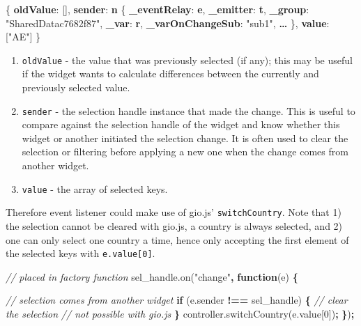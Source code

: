 \documentclass[10pt,]{krantz}
\makeatletter
\newenvironment{Shaded}{\begin{snugshade}}{\end{snugshade}}
\newcommand{\AttributeTok}[1]{\textcolor[rgb]{0.61,0.61,0.61}{#1}}
\newcommand{\CommentTok}[1]{\textcolor[rgb]{0.37,0.37,0.37}{\textit{#1}}}
\newcommand{\ControlFlowTok}[1]{\textcolor[rgb]{0.27,0.27,0.27}{\textbf{#1}}}
\newcommand{\DecValTok}[1]{\textcolor[rgb]{0.06,0.06,0.06}{#1}}
\newcommand{\ErrorTok}[1]{\textcolor[rgb]{0.14,0.14,0.14}{\textbf{#1}}}
\newcommand{\FunctionTok}[1]{\textcolor[rgb]{0,0,0}{#1}}
\newcommand{\KeywordTok}[1]{\textcolor[rgb]{0.27,0.27,0.27}{\textbf{#1}}}
\newcommand{\NormalTok}[1]{#1}
\newcommand{\OperatorTok}[1]{\textcolor[rgb]{0.43,0.43,0.43}{\textbf{#1}}}
\newcommand{\OtherTok}[1]{\textcolor[rgb]{0.37,0.37,0.37}{#1}}
\newcommand{\StringTok}[1]{\textcolor[rgb]{0.5,0.5,0.5}{#1}}
\newcommand{\VariableTok}[1]{\textcolor[rgb]{0,0,0}{#1}}
\providecommand{\tightlist}{%
  \setlength{\itemsep}{0pt}\setlength{\parskip}{0pt}}
\newenvironment{kframe}{%
\medskip{}
\setlength{\fboxsep}{.8em}
 \def\at@end@of@kframe{}%
 \ifinner\ifhmode%
  \def\at@end@of@kframe{\end{minipage}}%
  \begin{minipage}{\columnwidth}%
 \fi\fi%
 \def\FrameCommand##1{\hskip\@totalleftmargin \hskip-\fboxsep
 \colorbox{shadecolor}{##1}\hskip-\fboxsep
     \hskip-\linewidth \hskip-\@totalleftmargin \hskip\columnwidth}%
 \MakeFramed {\advance\hsize-\width
   \@totalleftmargin\z@ \linewidth\hsize
   \@setminipage}}%
 {\par\unskip\endMakeFramed%
 \at@end@of@kframe}
\renewenvironment{Shaded}{\begin{kframe}}{\end{kframe}}
\makeatother
\begin{document}
\begin{Shaded}
\begin{Highlighting}[]
\FunctionTok{\{}
  \ErrorTok{oldValue}\FunctionTok{:} \OtherTok{[]}\FunctionTok{,}
  \ErrorTok{sender}\FunctionTok{:} \ErrorTok{n} \FunctionTok{\{}
    \ErrorTok{_eventRelay}\FunctionTok{:} \ErrorTok{e}\FunctionTok{,} 
    \ErrorTok{_emitter}\FunctionTok{:} \ErrorTok{t}\FunctionTok{,} 
    \ErrorTok{_group}\FunctionTok{:} \StringTok{"SharedDatac7682f87"}\FunctionTok{,} 
    \ErrorTok{_var}\FunctionTok{:} \ErrorTok{r}\FunctionTok{,} 
    \ErrorTok{_varOnChangeSub}\FunctionTok{:} \StringTok{"sub1"}\FunctionTok{,} 
    \ErrorTok{…}
  \FunctionTok{\},}
  \ErrorTok{value}\FunctionTok{:} \OtherTok{[}\StringTok{"AE"}\OtherTok{]}
\FunctionTok{\}}
\end{Highlighting}
\end{Shaded}

\begin{enumerate}
\def\labelenumi{\arabic{enumi}.}
\tightlist
\item
  \texttt{oldValue} - the value that was previously selected (if any); this may be useful if the widget wants to calculate differences between the currently and previously selected value.
\item
  \texttt{sender} - the selection handle instance that made the change. This is useful to compare against the selection handle of the widget and know whether this widget or another initiated the selection change. It is often used to clear the selection or filtering before applying a new one when the change comes from another widget.
\item
  \texttt{value} - the array of selected keys.
\end{enumerate}

Therefore event listener could make use of gio.js' \texttt{switchCountry}. Note that 1) the selection cannot be cleared with gio.js, a country is always selected, and 2) one can only select one country a time, hence only accepting the first element of the selected keys with \texttt{e.value{[}0{]}}.

\begin{Shaded}
\begin{Highlighting}[]
\CommentTok{// placed in factory function}
\VariableTok{sel_handle}\NormalTok{.}\AttributeTok{on}\NormalTok{(}\StringTok{"change"}\OperatorTok{,} \KeywordTok{function}\NormalTok{(e) }\OperatorTok{\{}

  \CommentTok{// selection comes from another widget}
  \ControlFlowTok{if}\NormalTok{ (}\VariableTok{e}\NormalTok{.}\AttributeTok{sender} \OperatorTok{!==}\NormalTok{ sel_handle) }\OperatorTok{\{}
    \CommentTok{// clear the selection}
    \CommentTok{// not possible with gio.js}
  \OperatorTok{\}}
  \VariableTok{controller}\NormalTok{.}\AttributeTok{switchCountry}\NormalTok{(}\VariableTok{e}\NormalTok{.}\AttributeTok{value}\NormalTok{[}\DecValTok{0}\NormalTok{])}\OperatorTok{;}
\OperatorTok{\}}\NormalTok{)}\OperatorTok{;}
\end{Highlighting}
\end{Shaded}
\end{document}
